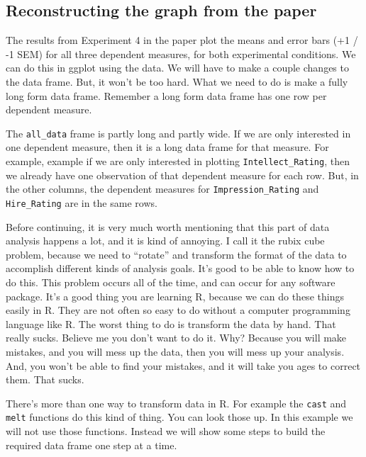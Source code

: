 \documentclass[
]{book}
\begin{document}
\hypertarget{reconstructing-the-graph-from-the-paper}{%
\subsection{Reconstructing the graph from the paper}\label{reconstructing-the-graph-from-the-paper}}

The results from Experiment 4 in the paper plot the means and error bars (+1 / -1 SEM) for all three dependent measures, for both experimental conditions. We can do this in ggplot using the data. We will have to make a couple changes to the data frame. But, it won't be too hard. What we need to do is make a fully long form data frame. Remember a long form data frame has one row per dependent measure.

The \texttt{all\_data} frame is partly long and partly wide. If we are only interested in one dependent measure, then it is a long data frame for that measure. For example, example if we are only interested in plotting \texttt{Intellect\_Rating}, then we already have one observation of that dependent measure for each row. But, in the other columns, the dependent measures for \texttt{Impression\_Rating} and \texttt{Hire\_Rating} are in the same rows.

Before continuing, it is very much worth mentioning that this part of data analysis happens a lot, and it is kind of annoying. I call it the rubix cube problem, because we need to ``rotate'' and transform the format of the data to accomplish different kinds of analysis goals. It's good to be able to know how to do this. This problem occurs all of the time, and can occur for any software package. It's a good thing you are learning R, because we can do these things easily in R. They are not often so easy to do without a computer programming language like R. The worst thing to do is transform the data by hand. That really sucks. Believe me you don't want to do it. Why? Because you will make mistakes, and you will mess up the data, then you will mess up your analysis. And, you won't be able to find your mistakes, and it will take you ages to correct them. That sucks.

There's more than one way to transform data in R. For example the \texttt{cast} and \texttt{melt} functions do this kind of thing. You can look those up. In this example we will not use those functions. Instead we will show some steps to build the required data frame one step at a time.
\end{document}
